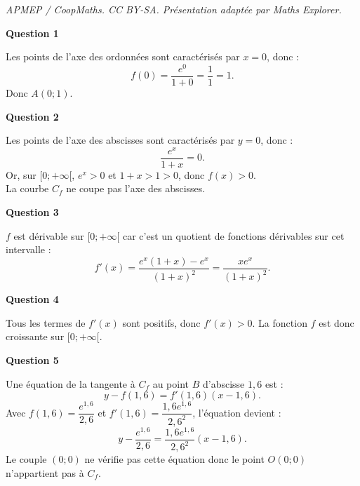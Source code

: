 \documentclass[10pt]{article}
\begin{document}
\noindent\textit{APMEP / CoopMaths. CC BY-SA. Présentation adaptée par Maths Explorer.}\par\medskip
\textbf{Question 1}
	
	Les points de l’axe des ordonnées sont caractérisés par $x = 0$, donc :
	\[
	f(0) = \dfrac{e^0}{1+0} = \dfrac{1}{1} = 1.
	\]
	Donc $A(0;1)$.
	
	\textbf{Question 2}
	
	Les points de l’axe des abscisses sont caractérisés par $y = 0$, donc :
	\[
	\dfrac{e^x}{1 + x} = 0.
	\]
	Or, sur $[0; +\infty[$, $e^x > 0$ et $1 + x > 1 > 0$, donc $f(x) > 0$.\\
	 La courbe $C_f$ ne coupe pas l'axe des abscisses.
	
	\textbf{Question 3}
	
	$f$ est dérivable sur $[0; +\infty[$ car c’est un quotient de fonctions dérivables sur cet intervalle :
	\[
	f'(x) = \dfrac{e^x(1 + x) - e^x}{(1 + x)^2} = \dfrac{x e^x}{(1 + x)^2}.
	\]
	
	\textbf{Question 4}
	
	Tous les termes de $f'(x)$ sont positifs, donc $f'(x) > 0$. La fonction $f$ est donc croissante sur $[0; +\infty[$.
	
	\textbf{Question 5}
	
	Une équation de la tangente à $C_f$ au point $B$ d’abscisse $1,6$ est :
	\[
	y - f(1,6) = f'(1,6)(x - 1,6).
	\]
	Avec $f(1,6) = \dfrac{e^{1,6}}{2,6}$ et $f'(1,6) = \dfrac{1,6 e^{1,6}}{2,6^2}$, l'équation devient :
	\[
	y - \dfrac{e^{1,6}}{2,6} = \dfrac{1,6 e^{1,6}}{2,6^2}(x - 1,6).
	\]
Le couple $(0;0)$ ne vérifie pas cette équation donc le point $O(0; 0)$ n'appartient pas à $C_f$.
\end{document}
